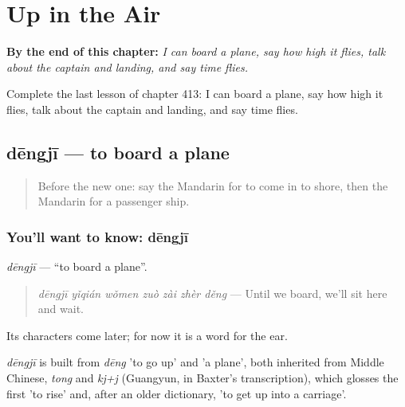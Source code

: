 
\chapter{Up in the Air}
\label{ch:zh-up-in-the-air}

\begin{chapteropening}
\textbf{By the end of this chapter:} \emph{I can board a plane, say how high it flies, talk about the captain and landing, and say time flies.}

Complete the last lesson of chapter 413: I can board a plane, say how high it flies, talk about the captain and landing, and say time flies.
\end{chapteropening}

\section[dēngjī]{dēngjī — to board a plane}

\label{lesson:ZH-C413-dengji-board}



\begin{quote}
Before the new one: say the Mandarin for to come in to shore, then the Mandarin for a passenger ship.
\end{quote}

\subsection*{You'll want to know: dēngjī}
\emph{dēngjī} — \textquotedblleft{}to board a plane\textquotedblright{}.

\begin{quote}
\emph{dēngjī yǐqián wǒmen zuò zài zhèr děng} — Until we board, we'll sit here and wait.
\end{quote}

Its characters come later; for now it is a word for the ear.

\begin{cousinweb}
\emph{dēngjī} is built from \emph{dēng} 'to go up' and  'a plane', both inherited from Middle Chinese, \emph{tong} and \emph{kj+j} (Guangyun, in Baxter's transcription), which glosses the first 'to rise' and, after an older dictionary, 'to get up into a carriage'.
\end{cousinweb}

